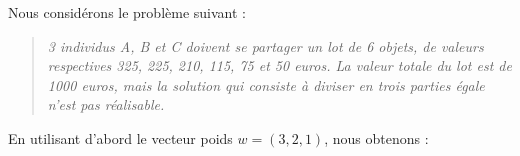 \documentclass{article}
\begin{document}
Nous considérons le problème suivant :
\begin{quote}
\emph{3 individus A, B et C doivent se partager un lot de 6 objets, de valeurs respectives 325, 225, 210, 115, 75 et 50 euros. La valeur totale du lot est de 1000 euros, mais la solution qui consiste à diviser en trois parties égale n'est pas réalisable.}
\end{quote}

En utilisant d'abord le vecteur poids $w = (3,2,1)$, nous obtenons :
\end{document}
